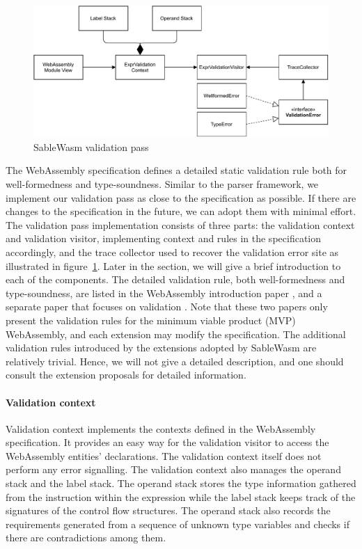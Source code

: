 \begin{figure}
  \centering
  \includegraphics[width=\textwidth]{Images/sablewasm-validation.pdf}
  \caption{SableWasm validation pass}
  \label{fig:sablewasm-validation}
\end{figure}

The WebAssembly specification defines a detailed static validation rule both for
well-formedness and type-soundness. Similar to the parser framework, we
implement our validation pass as close to the specification as possible. If
there are changes to the specification in the future, we can adopt them with
minimal effort. The validation pass implementation consists of three parts:
the validation context and validation visitor, implementing context and rules
in the specification accordingly, and the trace collector used to recover the
validation error site as illustrated in figure~\ref{fig:sablewasm-validation}.
Later in the section, we will give a brief introduction to each of the
components. The detailed validation rule, both well-formedness and
type-soundness, are listed in the WebAssembly introduction paper
\cite{10.1145/3062341.3062363}, and a separate paper that focuses on validation
\cite{10.1145/3167082}. Note that these two papers only present the validation
rules for the minimum viable product (MVP) WebAssembly, and each extension may
modify the specification.  The additional validation rules introduced by the
extensions adopted by SableWasm are relatively trivial. Hence, we will not give
a detailed description, and one should consult the extension proposals for
detailed information.

\paragraph{Validation context}
Validation context implements the contexts defined in the WebAssembly
specification. It provides an easy way for the validation visitor to access the
WebAssembly entities' declarations. The validation context itself does not
perform any error signalling. The validation context also manages the operand
stack and the label stack. The operand stack stores the type information
gathered from the instruction within the expression while the label stack keeps
track of the signatures of the control flow structures. The operand stack also
records the requirements generated from a sequence of unknown type variables and
checks if there are contradictions among them.

